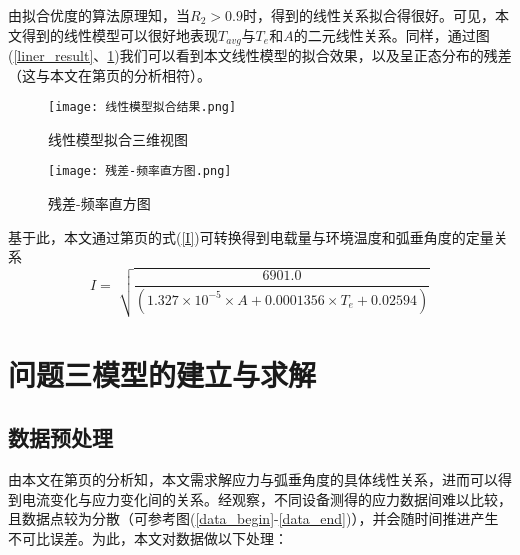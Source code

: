\documentclass[withoutpreface,bwprint]{cumcmthesis}  %
\begin{document}
        由拟合优度的算法原理知，当$R_{2}>0.9$时，得到的线性关系拟合得很好。可见，本文得到的线性模型可以很好地表现$T_{avg}$与$T_{e}$和$A$的二元线性关系。同样，通过图(\ref{liner_result}、\ref{res})我们可以看到本文线性模型的拟合效果，以及呈正态分布的残差（这与本文在第\pageref{sq_loss}页的分析相符）。
        \begin{figure}[h!] 
            \begin{minipage}{.48\textwidth} %
                \centering  
                \texttt{[image: 线性模型拟合结果.png]}  
                \caption{线性模型拟合三维视图}  
                \label{liner_result}
            \end{minipage}  
            \hfill %
            \begin{minipage}{.48\textwidth} %
                \centering  
                \texttt{[image: 残差-频率直方图.png]}  
                \caption{残差-频率直方图}  
                \label{res}
            \end{minipage}  
        \end{figure}
        
        
        基于此，本文通过第\pageref{I}页的式(\ref{I})可转换得到电载量与环境温度和弧垂角度的定量关系
        \begin{equation}\label{I_ta}
            I=\sqrt[]{ \frac{6901.0}{(1.327\times 10^{-5}\times A + 0.0001356\times T_{e} + 0.02594)} }
        \end{equation}
        
	\section{问题三模型的建立与求解}
        \subsection{数据预处理}
        \label{model_3}
        由本文在第\pageref{p3_ana}页的分析知，本文需求解应力与弧垂角度的具体线性关系，进而可以得到电流变化与应力变化间的关系。经观察，不同设备测得的应力数据间难以比较，且数据点较为分散（可参考图(\ref{data_begin}-\ref{data_end})），并会随时间推进产生不可比误差。为此，本文对数据做以下处理：
        
\end{document}
